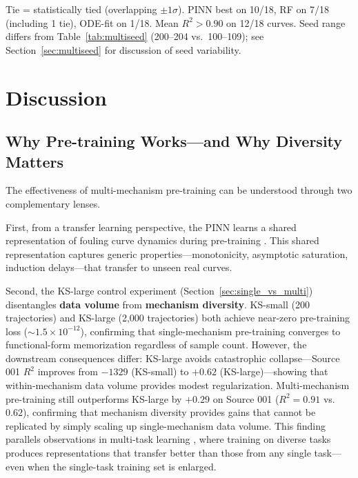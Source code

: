 \documentclass[review]{elsarticle}
\begin{document}
\begin{table}[htbp]
\vspace{4pt}
\footnotesize *Tie = statistically tied (overlapping $\pm 1\sigma$). PINN best on 10/18, RF on 7/18 (including 1 tie), ODE-fit on 1/18. Mean $R^2 > 0.90$ on 12/18 curves. Seed range differs from Table~\ref{tab:multiseed} (200--204 vs.\ 100--109); see Section~\ref{sec:multiseed} for discussion of seed variability.
\end{table}

\section{Discussion}

\subsection{Why Pre-training Works---and Why Diversity Matters}

The effectiveness of multi-mechanism pre-training can be understood through two complementary lenses.

First, from a transfer learning perspective, the PINN learns a shared representation of fouling curve dynamics during pre-training \cite{finn2017model}. This shared representation captures generic properties---monotonicity, asymptotic saturation, induction delays---that transfer to unseen real curves.

Second, the KS-large control experiment (Section~\ref{sec:single_vs_multi}) disentangles \textbf{data volume} from \textbf{mechanism diversity}. KS-small (200 trajectories) and KS-large (2,000 trajectories) both achieve near-zero pre-training loss ($\sim 1.5 \times 10^{-12}$), confirming that single-mechanism pre-training converges to functional-form memorization regardless of sample count. However, the downstream consequences differ: KS-large avoids catastrophic collapse---Source 001 $R^2$ improves from $-1329$ (KS-small) to $+0.62$ (KS-large)---showing that within-mechanism data volume provides modest regularization. Multi-mechanism pre-training still outperforms KS-large by $+0.29$ on Source 001 ($R^2 = 0.91$ vs.\ $0.62$), confirming that mechanism diversity provides gains that cannot be replicated by simply scaling up single-mechanism data volume. This finding parallels observations in multi-task learning \cite{neyshabur2015search}, where training on diverse tasks produces representations that transfer better than those from any single task---even when the single-task training set is enlarged.
\end{document}
